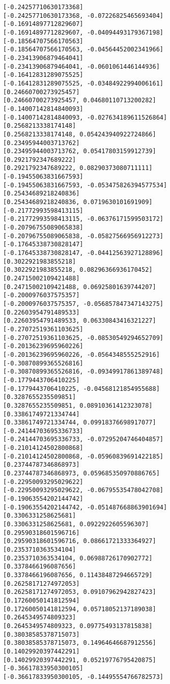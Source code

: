 \documentclass[11pt]{article}
\begin{document}
\begin{Verbatim}[commandchars=\\\{\}]
[-0.24257710630173368]
[-0.24257710630173368, -0.07226825465693404]
[-0.16914897712829607]
[-0.16914897712829607, -0.04094493179367198]
[-0.18564707566170563]
[-0.18564707566170563, -0.04564452002341966]
[-0.23413906879464041]
[-0.23413906879464041, -0.0601061446144936]
[-0.16412831289075525]
[-0.16412831289075525, -0.03484922994006161]
[0.24660700273925457]
[0.24660700273925457, 0.04680110713200282]
[-0.14007142814840093]
[-0.14007142814840093, -0.027634189611526864]
[0.2568213338174148]
[0.2568213338174148, 0.054243940922724866]
[0.23495944003713762]
[0.23495944003713762, 0.05417803159912739]
[0.2921792347689222]
[0.2921792347689222, 0.08290373080711111]
[-0.19455063831667593]
[-0.19455063831667593, -0.053475826394577534]
[0.25434689218240836]
[0.25434689218240836, 0.0719630101691909]
[-0.21772993598413115]
[-0.21772993598413115, -0.06376171599503172]
[-0.20796755089065838]
[-0.20796755089065838, -0.05827566956912273]
[-0.17645338730828147]
[-0.17645338730828147, -0.04412563927128896]
[0.3022921983855218]
[0.3022921983855218, 0.08296366936170452]
[0.24715002109421488]
[0.24715002109421488, 0.06925801639744207]
[-0.2000976037575357]
[-0.2000976037575357, -0.056857847347143275]
[0.22603954791489533]
[0.22603954791489533, 0.06330843416321227]
[-0.27072519361103625]
[-0.27072519361103625, -0.08530549294652709]
[-0.20136239695960226]
[-0.20136239695960226, -0.0564348555252916]
[-0.30870899365526816]
[-0.30870899365526816, -0.09349917861389748]
[-0.1779443706410225]
[-0.1779443706410225, -0.04568121854955688]
[0.3287655235509851]
[0.3287655235509851, 0.08910361412323078]
[0.33861749721334744]
[0.33861749721334744, 0.09918376698917077]
[-0.24144703695336733]
[-0.24144703695336733, -0.07295204746404857]
[-0.21014124502800868]
[-0.21014124502800868, -0.05960839691422185]
[0.23744787346868973]
[0.23744787346868973, 0.059685350970886765]
[-0.22950093295029622]
[-0.22950093295029622, -0.06795535478042708]
[-0.19063554202144742]
[-0.19063554202144742, -0.051487668863901694]
[0.3306331258625681]
[0.3306331258625681, 0.0922922605596307]
[0.29590318601596716]
[0.29590318601596716, 0.08661721333364927]
[0.2353710363534104]
[0.2353710363534104, 0.06988726170902772]
[0.3378466196087656]
[0.3378466196087656, 0.11438487294665729]
[0.26258171274972053]
[0.26258171274972053, 0.09107962942827423]
[0.17260050141812594]
[0.17260050141812594, 0.05718052137189038]
[0.2645349574809323]
[0.2645349574809323, 0.09775493137815838]
[0.38038585378715073]
[0.38038585378715073, 0.14964646687912556]
[0.14029920397442291]
[0.14029920397442291, 0.05219776795420875]
[-0.36617833950300105]
[-0.36617833950300105, -0.14495554766782573]

\end{Verbatim}
\end{document}
